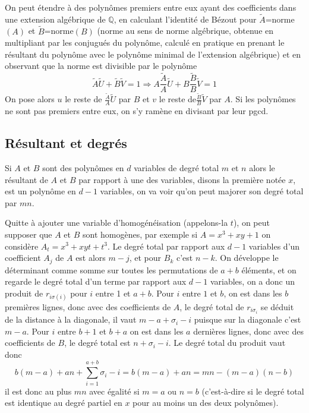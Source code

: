 \documentclass[a4paper,11pt]{article}
\newcommand{\Q}{{\mathbb{Q}}}
\begin{document}
\begin{giacjshere}
On peut \'etendre \`a des polyn\^omes premiers entre eux ayant des coefficients
dans une extension alg\'ebrique de $\Q$, en calculant l'identit\'e
de B\'ezout pour $\tilde{A}$=norme$(A)$ et 
$\tilde{B}$=norme$(B)$ (norme au sens de norme
alg\'ebrique, obtenue en multipliant par les conjugu\'es du
polyn\^ome, calcul\'e en pratique en prenant le r\'esultant
du polyn\^ome avec le polyn\^ome minimal de l'extension
alg\'ebrique) et en observant que
la norme est divisible par le polyn\^ome
$$ \tilde{A} \tilde{U}+\tilde{B}\tilde{V}=1
\Rightarrow A \frac{\tilde{A}}{A} \tilde{U}+ 
B \frac{\tilde{B}}{B}\tilde{V}=1$$
On pose alors $u$ le reste de $ \frac{\tilde{A}}{A} \tilde{U}$ par $B$
et $v$ le reste de$ \frac{\tilde{B}}{B}\tilde{V}$ par $A$.
Si les polyn\^omes ne sont pas premiers entre eux, on s'y ram\`ene
en divisant par leur pgcd.

\subsection{R\'esultant et degr\'es}
Si $A$ et $B$ sont des polyn\^omes en $d$ variables de degr\'e
total $m$ et $n$ alors le r\'esultant de $A$ et $B$ par rapport \`a
une des variables, disons la premi\`ere not\'ee $x$,
 est un polyn\^ome en $d-1$ variables, on va voir qu'on peut
majorer son degr\'e total par $mn$.

Quitte \`a ajouter une variable d'homog\'en\'eisation (appelons-la $t$), on peut
supposer que $A$ et $B$ sont homog\`enes, par exemple
si $A=x^3+xy+1$ on consid\`ere $A_t=x^3+xyt+t^3$. Le degr\'e total 
par rapport aux $d-1$ variables d'un
coefficient $A_j$ de $A$ est alors $m-j$, et pour $B_k$ c'est $n-k$.
On d\'eveloppe le d\'eterminant comme somme sur toutes les
permutations de $a+b$ \'el\'ements, et on regarde le degr\'e
total d'un terme par rapport aux $d-1$ variables, on a donc
un produit de $r_{i \sigma(i)}$ pour $i$ entre 1 et $a+b$. Pour $i$
entre $1$ et $b$, on est dans les $b$ premi\`eres lignes, donc
avec des coefficients de $A$, le degr\'e total de $r_{i \sigma_i}$
se d\'eduit de la distance \`a la diagonale, il vaut
$m-a+\sigma_{i}-i$ puisque sur la diagonale c'est $m-a$.
Pour $i$ entre $b+1$ et $b+a$ on est dans les $a$ derni\`eres
lignes, donc avec des coefficients de $B$, le degr\'e total est
$n+\sigma_i-i$. Le degr\'e total du produit vaut donc
$$ b(m-a)+an+\sum_{i=1}^{a+b} \sigma_i -i = b(m-a)+an=mn-(m-a)(n-b)$$
il est donc au plus $mn$ avec \'egalit\'e si $m=a$ ou $n=b$
(c'est-\`a-dire si le degr\'e total est identique au degr\'e partiel
en $x$ pour au moins un des deux polyn\^omes).


\end{giacjshere}
\end{document}
